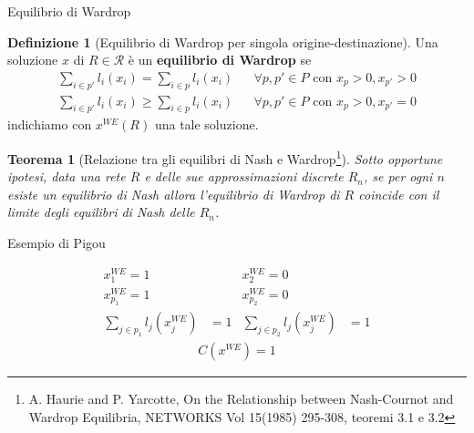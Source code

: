 \documentclass{beamer}
\newcounter{counter1}
\theoremstyle{plain}
\newtheorem{myteo}[counter1]{Teorema}
\theoremstyle{definition}
\newtheorem{mydef}[counter1]{Definizione}
\theoremstyle{remark}
\newcommand{\pa}[1]{\left(#1\right)}
\begin{document}
\begin{frame}{Equilibrio di Wardrop}
  \begin{mydef}[Equilibrio di Wardrop per singola origine-destinazione]
    Una soluzione $x$ di $R\in \mathcal{R}$ è un \textbf{equilibrio di
      Wardrop} se
    \[
      \begin{matrix}
        \sum _{i\in p'} l_i(x_i) = \sum _{i\in p} l_i(x_i) & & \forall
        p,p'\in P \text{ con } x_p >0, x_{p'} >0 \\
        \sum _{i\in p'} l_i(x_i) \ge \sum _{i\in p} l_i(x_i) & & \forall
        p,p'\in P \text{ con } x_p >0, x_{p'} =0 
      \end{matrix}
    \]
    indichiamo con $x^{WE}(R)$ una tale soluzione.
  \end{mydef}

  \begin{myteo}[Relazione tra gli equilibri di Nash e
    Wardrop\footnote{A. Haurie and P. Yarcotte, On the Relationship
      between Nash-Cournot and Wardrop Equilibria, NETWORKS Vol 15(1985) 295-308, teoremi 3.1 e 3.2}]
    Sotto opportune ipotesi, data una rete $R$ e delle sue approssimazioni
    discrete $R_n$, se per ogni $n$ esiste un equilibrio di Nash allora
    l'equilibrio di Wardrop di $R$ coincide con il limite degli equilibri di
    Nash delle $R_n$.
  \end{myteo}
\end{frame}

\begin{frame}{Esempio di Pigou}
  \begin{center}
  \end{center}
  \begin{align*}
    x^{WE}_1 = 1 & & x^{WE}_2 = 0 & \\
    x^{WE}_{p_1} = 1 & & x^{WE}_{p_2} = 0 & \\
    \sum_{j\in p_1} l_j\pa{x^{WE}_j} &= 1 & \sum_{j\in p_2} l_j\pa{x^{WE}_j} &= 1
  \end{align*}
  \begin{align*}
    C\pa{x^{WE}} = 1
  \end{align*}
\end{frame}
\end{document}
